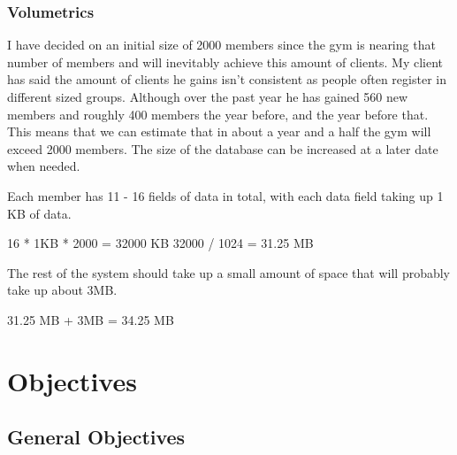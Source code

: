 \subsubsection{Volumetrics}

I have decided on an initial size of 2000 members since the gym is nearing that number of members and will inevitably achieve this amount of clients.  My client has said the amount of clients he gains isn't consistent as people often register in different sized groups. Although over the past year he has gained 560 new members and roughly 400 members the year before, and the year before that. This means that we can estimate that in about a year and a half the gym will exceed 2000 members. The size of the database can be increased at a later date when needed.  

Each member has 11 - 16 fields of data in total, with each data field taking up 1 KB of data.

16 * 1KB * 2000 = 32000 KB
32000 / 1024 = 31.25 MB

The rest of the system should take up a small amount of space that will probably take up about 3MB.

31.25 MB + 3MB = 34.25 MB

\section{Objectives}

\subsection{General Objectives}

